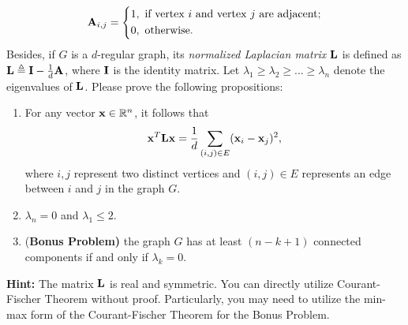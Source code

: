 \documentclass[english,onecolumn]{IEEEtran}
\newcommand{\Rbb}{\mathbb{R}}
\newcommand{\bA}{{\bf A}}
\newcommand{\bI}{{\bf I}}
\newcommand{\bL}{{\bf L}}
\newcommand{\bx}{{\bf x}}
\begin{document}
\begin{equation}
\bA_{i,j}=\left\{
\begin{aligned}
1 &, \text{ if vertex } i \text{ and vertex } j \text{ are adjacent;}\\
0 &, \text{ otherwise.}
\end{aligned}
\right.
\end{equation}
Besides, if $G$ is a $d$-regular graph, its \textit{normalized Laplacian matrix} $\bL$ is defined as $\bL\triangleq \bI-\frac{1}{d}\bA$, where $\bI$ is the identity matrix. 
Let $\lambda_1\geq \lambda_2\geq...\geq \lambda_n$ denote the eigenvalues of $\bL$. 
Please prove the following propositions:
\begin{enumerate}
    \item For any vector $\bx \in \Rbb^n$, it follows that 
	\begin{equation}
	\label{C1+}
		\bx^T\bL\bx=\frac{1}{d}\sum_{(i,j)\in E}(\bx_i-\bx_j)^2,
	\end{equation} 
	where $i,j$ represent two distinct vertices and $(i,j)\in E$ represents an edge between $i$ and $j$ in the graph $G$.
	\item $\lambda_n=0$ and $\lambda_1\leq 2$.
	\item {\color{blue}(\textbf{Bonus Problem)}} the graph $G$ has at least $(n-k+1)$ connected components if and only if $\lambda_k=0$. 
\end{enumerate}



\noindent\textbf{Hint:} 
The matrix $\bL$ is real and symmetric. 
	You can directly utilize Courant-Fischer Theorem without proof. Particularly, you may need to utilize the min-max form of the Courant-Fischer Theorem for the Bonus Problem.
\end{document}

